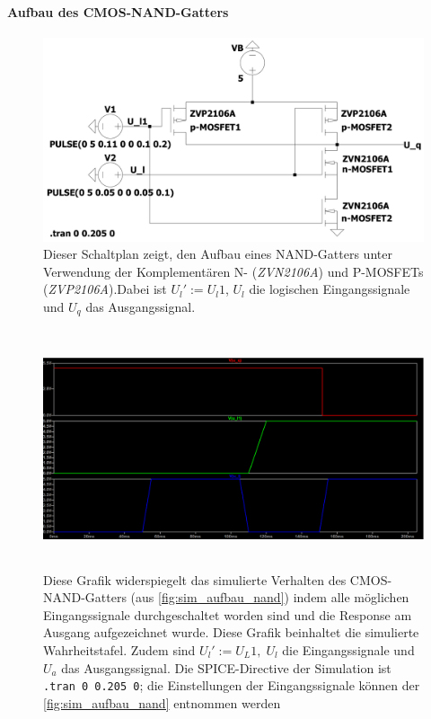 \documentclass[12pt,english,ngerman]{scrartcl}
\begin{document}
\paragraph{Aufbau des CMOS-NAND-Gatters}

\begin{figure}[H]
  \centering
    \includegraphics[width=\textwidth, height=6cm,keepaspectratio]{./simdaten_lab/cmos/nand/schaltung.png}
  \caption{Dieser Schaltplan zeigt, den Aufbau eines NAND-Gatters unter
    Verwendung der Komplementären N- (\textit{ZVN2106A}) und P-MOSFETs
    (\textit{ZVP2106A}).Dabei ist $U_l':=U_l1$, $U_l$ die logischen
  Eingangssignale und $U_q$ das Ausgangssignal.}
  \label{fig:sim_aufbau_nand}
\end{figure}


\begin{figure}[H]
  \centering
    \includegraphics[width=\linewidth, height=7cm]{./simdaten_lab/cmos/nand/nand_funktion.png}
  \caption{Diese Grafik widerspiegelt das simulierte Verhalten des CMOS-NAND-Gatters (aus
    \autoref{fig:sim_aufbau_nand}) indem alle möglichen Eingangssignale
    durchgeschaltet worden sind und die Response am Ausgang aufgezeichnet
    wurde. Diese Grafik beinhaltet die simulierte Wahrheitstafel. Zudem sind
    $U_l':=U_L1,\; U_l$ die Eingangssignale und $U_a$ das Ausgangssignal. Die
    SPICE-Directive der Simulation ist \texttt{.tran 0 0.205 0}; die
  Einstellungen der Eingangssignale können der \autoref{fig:sim_aufbau_nand}
  entnommen werden}
  \label{fig:sim_nand_wahrheit}
\end{figure}
\end{document}
